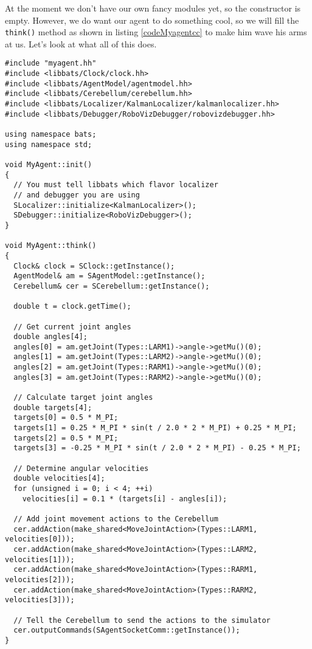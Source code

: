 At the moment we don't have our own fancy modules yet, so the
constructor is empty. However, we do want our agent to do something
cool, so we will fill the {\tt think()} method as shown in listing
\ref{codeMyagentcc} to make him wave his arms at us. Let's look at
what all of this does.

\begin{lstlisting}[float,caption={\tt myagent.cc},label=codeMyagentcc,frame=single]
#include "myagent.hh"
#include <libbats/Clock/clock.hh>
#include <libbats/AgentModel/agentmodel.hh>
#include <libbats/Cerebellum/cerebellum.hh>
#include <libbats/Localizer/KalmanLocalizer/kalmanlocalizer.hh>
#include <libbats/Debugger/RoboVizDebugger/robovizdebugger.hh>

using namespace bats;
using namespace std;

void MyAgent::init()
{
  // You must tell libbats which flavor localizer
  // and debugger you are using
  SLocalizer::initialize<KalmanLocalizer>();
  SDebugger::initialize<RoboVizDebugger>();
}

void MyAgent::think()
{
  Clock& clock = SClock::getInstance();
  AgentModel& am = SAgentModel::getInstance();
  Cerebellum& cer = SCerebellum::getInstance();
  
  double t = clock.getTime();
  
  // Get current joint angles
  double angles[4];
  angles[0] = am.getJoint(Types::LARM1)->angle->getMu()(0);
  angles[1] = am.getJoint(Types::LARM2)->angle->getMu()(0);
  angles[2] = am.getJoint(Types::RARM1)->angle->getMu()(0);
  angles[3] = am.getJoint(Types::RARM2)->angle->getMu()(0);
  
  // Calculate target joint angles
  double targets[4];
  targets[0] = 0.5 * M_PI;
  targets[1] = 0.25 * M_PI * sin(t / 2.0 * 2 * M_PI) + 0.25 * M_PI;
  targets[2] = 0.5 * M_PI;
  targets[3] = -0.25 * M_PI * sin(t / 2.0 * 2 * M_PI) - 0.25 * M_PI;
  
  // Determine angular velocities
  double velocities[4];
  for (unsigned i = 0; i < 4; ++i)
    velocities[i] = 0.1 * (targets[i] - angles[i]);
  
  // Add joint movement actions to the Cerebellum
  cer.addAction(make_shared<MoveJointAction>(Types::LARM1, velocities[0]));
  cer.addAction(make_shared<MoveJointAction>(Types::LARM2, velocities[1]));
  cer.addAction(make_shared<MoveJointAction>(Types::RARM1, velocities[2]));
  cer.addAction(make_shared<MoveJointAction>(Types::RARM2, velocities[3]));
  
  // Tell the Cerebellum to send the actions to the simulator
  cer.outputCommands(SAgentSocketComm::getInstance());
}
\end{lstlisting}

